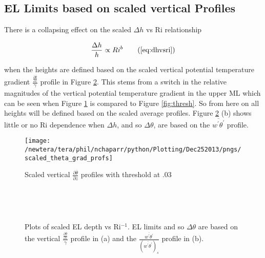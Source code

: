\clearpage
\subsection{\acs{EL} Limits based on scaled vertical Profiles}
\label{subsec:ellimscaledprof}

There is a collapsing effect on the scaled $\Delta h$ vs \acs{Ri} relationship 

\begin{equation}
\frac{\Delta h}{h} \propto Ri ^{b} \tag{\ref{eq:dhvsri}}
\end{equation}


when the heights are defined based on the scaled vertical potential temperature gradient 
$\frac{\frac{\partial \overline{\theta}}{\partial z}}{\gamma}$ profile in Figure \ref{fig:deltahinvri_scaled}.  This stems
from a switch in the relative magnitudes of the vertical potential temperature gradient in the upper \acs{ML} which can be seen when Figure \ref{fig:thresh3} is compared to Figure \ref{fig:thresh}. So from here on all heights will be defined based on the scaled average profiles.  Figure \ref{fig:deltahinvri_scaled} (b) shows little or no \acs{Ri} dependence when $\Delta h$, and so $\Delta \theta$, are based on the $\overline{w^{'}\theta^{'}}$ profile.  
\\

\begin{figure}[htbp]
    \centering
    \texttt{[image: /newtera/tera/phil/nchaparr/python/Plotting/Dec252013/pngs/scaled\_theta\_grad\_profs]}
    \caption{Scaled vertical $\frac{\partial \overline{\theta}}{\partial z}$ profiles with threshold at .03}
    \label{fig:thresh3}   %
\end{figure}

\begin{figure}[htbp]
\begin{minipage}[b]{0.5\linewidth}
        \\
        \end{minipage}             
\quad
\begin{minipage}[b]{0.5\linewidth}
        \\      
       \end{minipage}
        \caption[scaled \acs{EL} depth vs \acs{Ri}$^{-1}$]{Plots of scaled \acs{EL} depth vs \acs{Ri}$^{-1}$. \acs{EL} limits and so $\Delta \theta$ are based on the vertical $\frac{\frac{\partial \overline{\theta}}{\partial z}}{\gamma}$ profile in (a) and the $\frac{\overline{w^{'}\theta^{'}}}{(\overline{w^{'}\theta^{'}})_{s}}$ profile in (b).}
        \label{fig:deltahinvri_scaled}
\end{figure}

